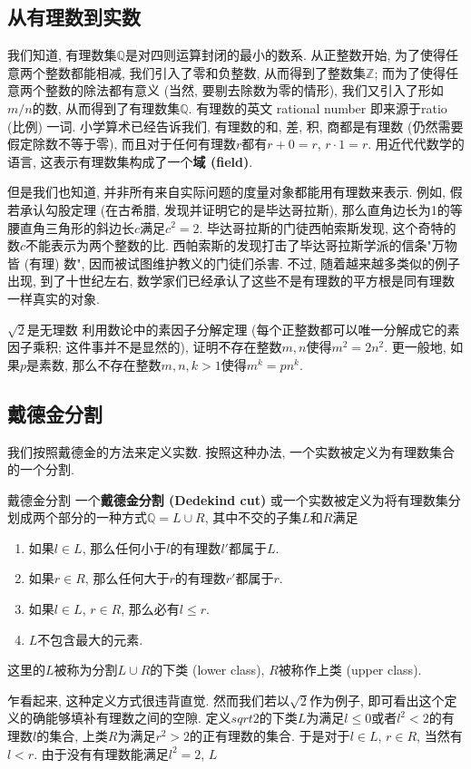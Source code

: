 
\subsection{从有理数到实数}

我们知道, 有理数集$\mathbb{Q}$是对四则运算封闭的最小的数系. 从正整数开始, 为了使得任意两个整数都能相减, 我们引入了零和负整数, 从而得到了整数集$\mathbb{Z}$; 而为了使得任意两个整数的除法都有意义 (当然, 要剔去除数为零的情形), 我们又引入了形如$m/n$的数, 从而得到了有理数集$\mathbb{Q}$. 有理数的英文 rational number 即来源于ratio (比例) 一词. 小学算术已经告诉我们, 有理数的和, 差, 积, 商都是有理数 (仍然需要假定除数不等于零), 而且对于任何有理数$r$都有$r+0=r$, $r\cdot1=r$. 用近代代数学的语言, 这表示有理数集构成了一个\textbf{域 (field)}.

但是我们也知道, 并非所有来自实际问题的度量对象都能用有理数来表示. 例如, 假若承认勾股定理 (在古希腊, 发现并证明它的是毕达哥拉斯), 那么直角边长为1的等腰直角三角形的斜边长$c$满足$c^2=2$. 毕达哥拉斯的门徒西帕索斯发现, 这个奇特的数$c$不能表示为两个整数的比. 西帕索斯的发现打击了毕达哥拉斯学派的信条"万物皆 (有理) 数", 因而被试图维护教义的门徒们杀害. 不过, 随着越来越多类似的例子出现, 到了十世纪左右, 数学家们已经承认了这些不是有理数的平方根是同有理数一样真实的对象.

\begin{exercise}{$\sqrt{2}$是无理数}
利用数论中的素因子分解定理 (每个正整数都可以唯一分解成它的素因子乘积; 这件事并不是显然的), 证明不存在整数$m,n$使得$m^2=2n^2$. 更一般地, 如果$p$是素数, 那么不存在整数$m,n,k>1$使得$m^k=pn^k$.
\end{exercise}

\subsection{戴德金分割}
我们按照戴德金的方法来定义实数. 按照这种办法, 一个实数被定义为有理数集合的一个分割.

\begin{definition}{戴德金分割}
一个\textbf{戴德金分割 (Dedekind cut)} 或一个实数被定义为将有理数集分划成两个部分的一种方式$\mathbb{Q}=L\cup R$, 其中不交的子集$L$和$R$满足

\begin{enumerate}
\item 如果$l\in L$, 那么任何小于$l$的有理数$l'$都属于$L$.
\item 如果$r\in R$, 那么任何大于$r$的有理数$r'$都属于$r$.
\item 如果$l\in L$, $r\in R$, 那么必有$l\leq r$.
\item $L$不包含最大的元素.
\end{enumerate}

这里的$L$被称为分割$L\cup R$的下类 (lower class), $R$被称作上类 (upper class).
\end{definition}

乍看起来, 这种定义方式很违背直觉. 然而我们若以$\sqrt{2}$作为例子, 即可看出这个定义的确能够填补有理数之间的空隙. 定义$sqrt{2}$的下类$L$为满足$l\leq0$或者$l^2<2$的有理数$l$的集合, 上类$R$为满足$r^2>2$的正有理数的集合. 于是对于$l\in L$, $r\in R$, 当然有$l<r$. 由于没有有理数能满足$l^2=2$, $L$